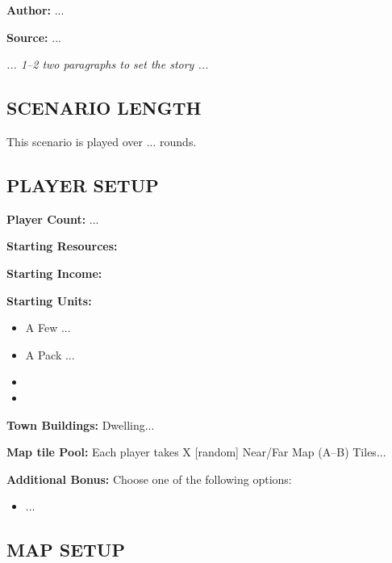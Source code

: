 
\begin{multicols*}{2}

\textbf{Author:} ...

\textbf{Source:} ...

\textit{... 1--2 two paragraphs to set the story ...}

\subsection*{\MakeUppercase{Scenario Length}}

This scenario is played over ... rounds.

\subsection*{\MakeUppercase{Player Setup}}

\textbf{Player Count:} ...

\textbf{Starting Resources:}\par
{}

\textbf{Starting Income:}\par
{}

\textbf{Starting Units:}
\begin{itemize}
  \item A Few ...
  \item A Pack ...
  \item {}
  \item {}
\end{itemize}

\textbf{Town Buildings:}  Dwelling...

\textbf{Map tile Pool:} Each player takes X [random] Near/Far Map (A--B) Tiles...

\textbf{Additional Bonus:} Choose one of the following options:

\begin{itemize}
    \item ...
\end{itemize}

\subsection*{\MakeUppercase{Map Setup}}


\end{multicols*}
